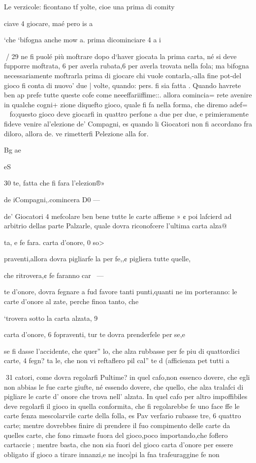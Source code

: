\documentclass[11pt,a6paper]{article}
\begin{document}
Le verzicole: ficontano tf
yolte, cioe una prima di comity

ciave 4 giocare, maé pero is
a

 

‘che ‘bifogna anche mow a.
prima dicominciare 4 a i

 
/ 29
ne fi puolé più moftrare dopo
d‘haver giocata la prima carta,
né si deve fupporre moftrata, 6
per averla rubata,6 per averla
trovata nella fola; ma bifogna
necessariamente moftrarla prima di giocare chi vuole contarla,-alla fine pot-del gioco fi
conta di nuovo’ due | volte,
quando: pers. fi sia fatta .
Quando havrete ben ap
prefe tutte queste cofe come neeeffariiffime::. allora comincia=
rete avenire in qualche cogni+
zione diquefto gioco, quale fi fa
nella forma, che diremo adef=
~ fo;questo gioco deve giocarfi in
quattro perfone a due per due,
e primieramente fideve venire
al’elezione de’ Compagni, es
quando li Giocatori non fi accordano fra diloro, allora de.
ve rimetterfi Pelezione alla for.

Bg ae

 
 

 

 

 

eS

30
te, fatta che fi fara l’elezion®»

de iCompagni,.comincera D0 —

de’ Giocatori 4 mefcolare ben
bene tutte le carte affieme » ¢
poi lafcierd ad arbitrio dellas
parte Palzarle, quale dovra
riconofcere l’ultima carta alza@

ta, e fe fara. carta d’onore, 0 so>

praventi,allora dovra pigliarfe
la per fe,,¢ pigliera tutte quelle,

che ritrovera,¢ fe faranno car~ —

te d’onore, dovra fegnare a fud
favore tanti punti,quanti ne im
porteranno: le carte d’onore al
zate, perche finoa tanto, che

‘trovera sotto la carta alzata, 9

carta d’onore, 6 fopraventi, tur
te dovra prenderfele per se,e

se fi dasse l’accidente, che quer”
lo, che alza rubbasse per fe piu
di quattordici carte, 4 fegn? ta
le, che non vi reftaflero pil cal”
te d (afficienza pet tutti a

 
31
catori, come dovra regolarfi
Pultime? in quel cafo,non essenco dovere, che egli non abbias
le fue carte giufte, né essendo
dovere, che quello, che alza
tralafci di pigliare le carte d’
onore che trova nell’ alzata. In
quel cafo per altro impoffibiles
deve regolarfi il gioco in quella
conformita, che fi regolarebbe
fe uno face ffe le carte fenza mescolarvile carte della folla, es
Pav verfario rubasse tre, 6 quattro carte; mentre dovrebbes
finire di prendere il fuo compimento delle carte da quelles
carte, che fono rimaste fuora
del gioco,poco importando,che
foflero cartaccie ; mentre basta,
che non sia fuori del gioco carta d’onore per essere obligato if
gioco a tirare innanzi,e ne inco]pi la fna trafeuraggine fe non
\end{document}
